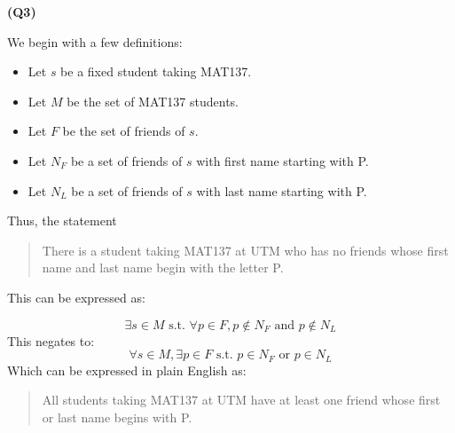 \documentclass[12pt, letterpaper]{article}
\begin{document}
    \textbf{(Q3)}

    We begin with a few definitions:

    \begin{itemize}
        \item Let $s$ be a fixed student taking MAT137.
        \item Let $M$ be the set of MAT137 students.
        \item Let $F$ be the set of friends of $s$.
        \item Let $N_{F}$ be a set of friends of $s$ with first name starting with P.
        \item Let $N_{L}$ be a set of friends of $s$ with last name starting with P.
    \end{itemize}

    Thus, the statement
    \begin{quote}
        There is a student taking MAT137 at UTM who has no friends whose first
        name and last name begin with the letter P.
    \end{quote}

    This can be expressed as:

    \[
        \exists s \in M \text{ s.t. } \forall p \in F, p \notin N_{F} \text{ and } p \notin N_{L}
    \]
    This negates to:
    \[
        \forall s \in M, \exists p \in F \text{ s.t. } p \in N_{F} \text{ or } p \in N_{L}
    \]
    Which can be expressed in plain English as:

    \begin{quote}
        All students taking MAT137 at UTM have at least one friend whose first or last name begins with P.
    \end{quote}
\end{document}
